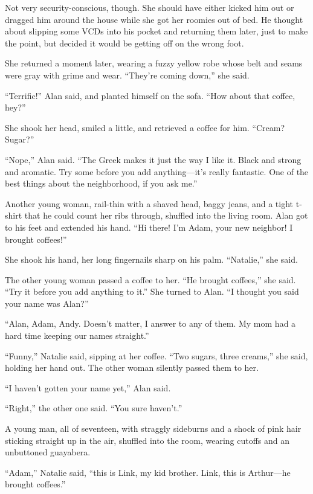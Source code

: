 Not very security-conscious, though.  She should have either kicked
him out or dragged him around the house while she got her roomies out
of bed.  He thought about slipping some VCDs into his pocket and
returning them later, just to make the point, but decided it would be
getting off on the wrong foot.

She returned a moment later, wearing a fuzzy yellow robe whose belt
and seams were gray with grime and wear.  ``They're coming down,'' she
said.

``Terrific!'' Alan said, and planted himself on the sofa.  ``How about
that coffee, hey?''

She shook her head, smiled a little, and retrieved a coffee for him. 
``Cream?  Sugar?''

``Nope,'' Alan said.  ``The Greek makes it just the way I like it. 
Black and strong and aromatic.  Try some before you add
anything---it's really fantastic.  One of the best things about the
neighborhood, if you ask me.''

Another young woman, rail-thin with a shaved head, baggy jeans, and a
tight t-shirt that he could count her ribs through, shuffled into the
living room.  Alan got to his feet and extended his hand.  ``Hi there! 
I'm Adam, your new neighbor!  I brought coffees!''

She shook his hand, her long fingernails sharp on his palm. 
``Natalie,'' she said.

The other young woman passed a coffee to her.  ``He brought coffees,''
she said.  ``Try it before you add anything to it.'' She turned to
Alan.  ``I thought you said your name was Alan?''

``Alan, Adam, Andy.  Doesn't matter, I answer to any of them.  My mom
had a hard time keeping our names straight.''

``Funny,'' Natalie said, sipping at her coffee.  ``Two sugars, three
creams,'' she said, holding her hand out.  The other woman silently
passed them to her.

``I haven't gotten your name yet,'' Alan said.

``Right,'' the other one said.  ``You sure haven't.''

A young man, all of seventeen, with straggly sideburns and a shock of
pink hair sticking straight up in the air, shuffled into the room,
wearing cutoffs and an unbuttoned guayabera.

``Adam,'' Natalie said, ``this is Link, my kid brother.  Link, this is
Arthur---he brought coffees.''

